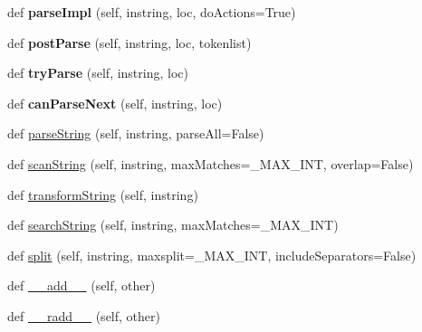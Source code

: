 \begin{DoxyCompactItemize}
def {\bfseries parse\+Impl} (self, instring, loc, do\+Actions=True)
\item 
\mbox{\label{classpkg__resources_1_1__vendor_1_1pyparsing_1_1_parser_element_aec3013d59c32a37672d20bc33ee1095b}} 
def {\bfseries post\+Parse} (self, instring, loc, tokenlist)
\item 
\mbox{\label{classpkg__resources_1_1__vendor_1_1pyparsing_1_1_parser_element_af8000cbf8e6f7daf91b5572a1d6c1266}} 
def {\bfseries try\+Parse} (self, instring, loc)
\item 
\mbox{\label{classpkg__resources_1_1__vendor_1_1pyparsing_1_1_parser_element_a9852fef0c208b9e6ee25521f2609c06b}} 
def {\bfseries can\+Parse\+Next} (self, instring, loc)
\item 
def \hyperlink{classpkg__resources_1_1__vendor_1_1pyparsing_1_1_parser_element_a10680bb4fd394b631357d464b399e63a}{parse\+String} (self, instring, parse\+All=False)
\item 
def \hyperlink{classpkg__resources_1_1__vendor_1_1pyparsing_1_1_parser_element_a7e7fdf9660796750819d13908cf34edb}{scan\+String} (self, instring, max\+Matches=\+\_\+\+M\+A\+X\+\_\+\+I\+NT, overlap=False)
\item 
def \hyperlink{classpkg__resources_1_1__vendor_1_1pyparsing_1_1_parser_element_af9259df34d2c525d5dc935fe4082d40c}{transform\+String} (self, instring)
\item 
def \hyperlink{classpkg__resources_1_1__vendor_1_1pyparsing_1_1_parser_element_adaa9a7ce387e187e4505bf68a98bd626}{search\+String} (self, instring, max\+Matches=\+\_\+\+M\+A\+X\+\_\+\+I\+NT)
\item 
def \hyperlink{classpkg__resources_1_1__vendor_1_1pyparsing_1_1_parser_element_a07496b6487e5aa0d90619fa4655e8393}{split} (self, instring, maxsplit=\+\_\+\+M\+A\+X\+\_\+\+I\+NT, include\+Separators=False)
\item 
def \hyperlink{classpkg__resources_1_1__vendor_1_1pyparsing_1_1_parser_element_afa021ee7188faf2cffd826344563b6bf}{\+\_\+\+\_\+add\+\_\+\+\_\+} (self, other)
\item 
def \hyperlink{classpkg__resources_1_1__vendor_1_1pyparsing_1_1_parser_element_a07a22c340662552fc7fa5438d85647a6}{\+\_\+\+\_\+radd\+\_\+\+\_\+} (self, other)

\end{DoxyCompactItemize}
